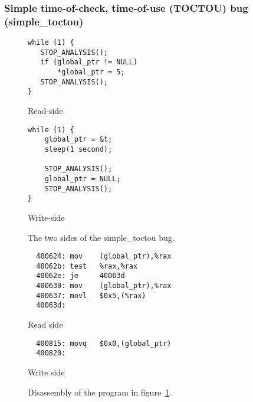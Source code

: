 \subsubsection{Simple time-of-check, time-of-use (TOCTOU) bug (simple\_toctou)}
\label{sect:eval:art:simple_toctou}



\begin{figure}
  \begin{subfloat}
    \begin{minipage}{50mm}
\begin{verbatim}
while (1) {
   STOP_ANALYSIS();
   if (global_ptr != NULL)
       *global_ptr = 5;
   STOP_ANALYSIS();
}
\end{verbatim}
    \end{minipage}
    \caption{Read-side}
  \end{subfloat}
  \begin{subfloat}
    \begin{minipage}{50mm}
\begin{verbatim}
while (1) {
    global_ptr = &t;
    sleep(1 second);

    STOP_ANALYSIS();
    global_ptr = NULL;
    STOP_ANALYSIS();
}
\end{verbatim}
    \end{minipage}
    \caption{Write-side}
  \end{subfloat}
  \label{fig:eval:simple_toctou}
  \caption{The two sides of the simple\_toctou bug.}
\end{figure}

\begin{figure}
  \begin{subfloat}
    \begin{minipage}{70mm}
\begin{verbatim}
  400624: mov    (global_ptr),%rax
  40062b: test   %rax,%rax
  40062e: je     40063d
  400630: mov    (global_ptr),%rax
  400637: movl   $0x5,(%rax)
  40063d:
\end{verbatim}
    \end{minipage}
    \caption{Read side}
  \end{subfloat}
  \begin{subfloat}
    \begin{minipage}{70mm}
\begin{verbatim}
  400815: movq   $0x0,(global_ptr)
  400820:
\end{verbatim}
    \end{minipage}
    \caption{Write side}
  \end{subfloat}
  \label{fig:eval:simple_toctou_compiled}
  \caption{Disassembly of the program in figure~\ref{fig:eval:simple_toctou}.}
\end{figure}


